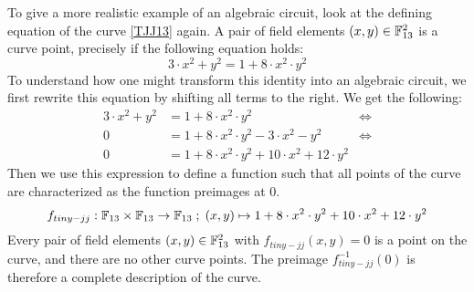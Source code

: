 \begin{example}
\label{ex:TJJ-circuit_1} To give a more realistic example of an algebraic circuit, look at the defining equation  of the  curve \ref{TJJ13} again. A pair of field elements 
$(x,y)\in \mathbb{F}_{13}^2$ is a curve point, precisely if the following equation holds:
$$
3\cdot x^2 + y^2 = 1+ 8\cdot x^2\cdot y^2
$$ 
To understand how one might transform this identity into an algebraic circuit, we first rewrite this equation by shifting all terms to the right. We get the following:
\begin{align*}
3\cdot x^2 + y^2 & = 1+ 8\cdot x^2\cdot y^2 & \Leftrightarrow\\
0 & = 1+ 8\cdot x^2\cdot y^2 - 3\cdot x^2 - y^2 & \Leftrightarrow\\
0 & = 1+ 8\cdot x^2\cdot y^2 + 10\cdot x^2 +12\cdot y^2
\end{align*}
Then we use this expression to define a function such that all points of the  curve are characterized as the function preimages at $0$.
$$
f_{tiny-jj}: \mathbb{F}_{13}\times \mathbb{F}_{13}\to \mathbb{F}_{13}\; ; \;
(x,y)\mapsto 1+ 8\cdot x^2\cdot y^2 + 10\cdot x^2 +12\cdot y^2
$$
Every pair of field elements $(x,y)\in \mathbb{F}_{13}^2$ with $f_{tiny-jj}(x,y)=0$ is a point on the  curve, and there are no other curve points. The preimage $f_{tiny-jj}^{-1}(0)$ is therefore a complete description of the  curve.


\end{example}
